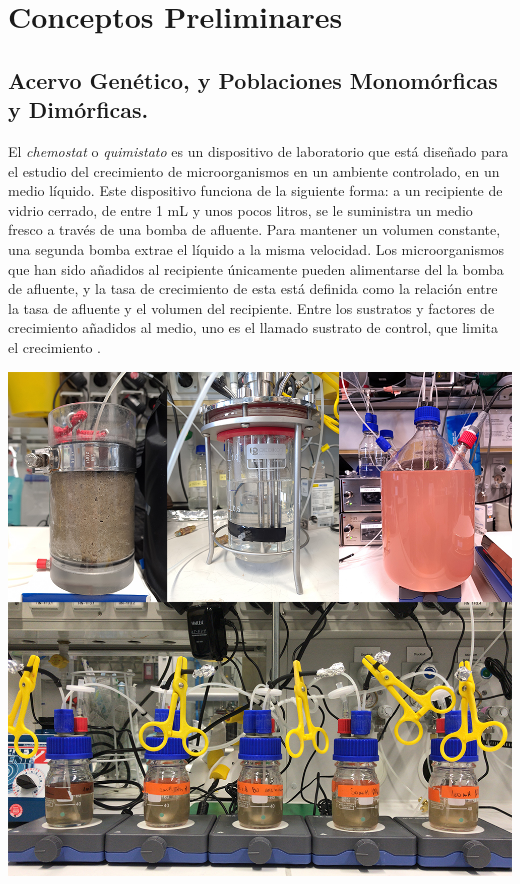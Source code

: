 \section{Conceptos Preliminares}
\subsection{Acervo Genético, y Poblaciones Monomórficas y Dimórficas.}

El \textit{chemostat} o \textit{quimistato} es un dispositivo de laboratorio que está diseñado para el estudio del crecimiento de microorganismos en un ambiente controlado, en un medio líquido. Este dispositivo funciona de la siguiente forma: a un recipiente de vidrio cerrado, de entre 1 mL y unos pocos litros, se le suministra un medio fresco a través de una bomba de afluente. Para mantener un volumen constante, una segunda bomba extrae el líquido a la misma velocidad. Los microorganismos que han sido añadidos al recipiente únicamente pueden alimentarse del la bomba de afluente, y la tasa de crecimiento de esta está definida como la relación entre la tasa de afluente y el volumen del recipiente. Entre los sustratos y factores de crecimiento añadidos al medio, uno es el llamado sustrato de control, que limita el crecimiento \citep{chemostat}.

\begin{center}
	\includegraphics[scale=0.2]{Chemostat.jpg}
\end{center}

